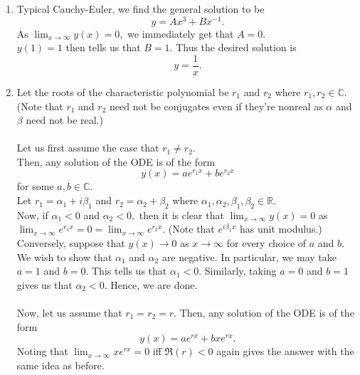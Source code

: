 \documentclass[12pt]{article}
\theoremstyle{definition}
\numberwithin{thm}{section}
\begin{document}
\begin{enumerate}[leftmargin=*, label = Q.\arabic*.]
\begin{enumerate}[start = 3, label = (\roman*)]
	\end{enumerate}
	\item Typical Cauchy-Euler, we find the general solution to be 
	\begin{equation*} 
		y = Ax^3 + Bx^{-1}.
	\end{equation*}
	As $\displaystyle\lim_{x\to \infty}y(x) = 0,$ we immediately get that $A = 0.$\\
	$y(1) = 1$ then tells us that $B = 1.$ Thus the desired solution is
	\begin{equation*} 
		y = \dfrac{1}{x}.
	\end{equation*}
	\item Let the roots of the characteristic polynomial be $r_1$ and $r_2$ where $r_1, r_2 \in \mathbb{C}.$\\
	(Note that $r_1$ and $r_2$ need not be conjugates even if they're nonreal as $\alpha$ and $\beta$ need not be real.)\\\\
	Let us first assume the case that $r_1 \neq r_2.$\\
	Then, any solution of the ODE is of the form
	\begin{equation*} 
		y(x) = ae^{r_1 x} + be^{r_2 x}
	\end{equation*}
	for some $a, b \in \mathbb{C}.$\\
	Let $r_1 = \alpha_1 + i\beta_1$ and $r_2 = \alpha_2 + \beta_2$ where $\alpha_1, \alpha_2, \beta_1, \beta_2 \in \mathbb{R}.$\\
	Now, if $\alpha_1 < 0$ and $\alpha_2 < 0,$ then it is clear that $\displaystyle\lim_{x\to \infty}y(x) = 0$ as $\displaystyle\lim_{x\to \infty}e^{r_1x} = 0 = \displaystyle\lim_{x\to \infty}e^{r_2x}.$ (Note that $e^{i\beta_1x}$ has unit modulus.)\\
	Conversely, suppose that $y(x) \to 0$ as $x \to \infty$ for every choice of $a$ and $b.$ We wish to show that $\alpha_1$ and $\alpha_2$ are negative. In particular, we may take $a = 1$ and $b = 0.$ This tells us that $\alpha_1 < 0.$ Similarly, taking $a = 0$ and $b = 1$ gives us that $\alpha_2 < 0.$ Hence, we are done.\\\\
	Now, let us assume that $r_1 = r_2 = r.$ Then, any solution of the ODE is of the form
	\begin{equation*} 
		y(x) = ae^{rx} + bxe^{rx}.
	\end{equation*}
	Noting that $\displaystyle\lim_{x\to \infty}xe^{rx} = 0$ iff $\Re(r) < 0$ again gives the answer with the same idea as before.
\end{enumerate}
\end{document}
